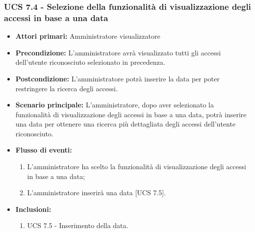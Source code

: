 \subsubsection{UCS 7.4 - Selezione della funzionalità di visualizzazione degli accessi in base a una data }
\begin{itemize}
	\item \textbf{Attori primari:} Amministratore visualizzatore
	\item \textbf{Precondizione:} L'amministratore avrà visualizzato tutti gli accessi dell'utente riconosciuto selezionato in precedenza.
	\item \textbf{Postcondizione:} L'amministratore potrà inserire la data per poter restringere la ricerca degli accessi.
	\item \textbf{Scenario principale:} L'amministratore, dopo aver selezionato la funzionalità di visualizzazione degli accessi in base a una data, potrà inserire una data per ottenere una ricerca più dettagliata degli accessi dell'utente riconosciuto.
	\item \textbf{Flusso di eventi:} 
	\begin{enumerate}
		\item L'amministratore ha scelto la funzionalità di visualizzazione degli accessi in base a una data;
		\item L'amministratore inserirà una data [UCS 7.5].
	\end{enumerate}
	\item \textbf{Inclusioni:}
	\begin{enumerate}
		\item UCS 7.5 - Inserimento della data.
	\end{enumerate}
\end{itemize}

